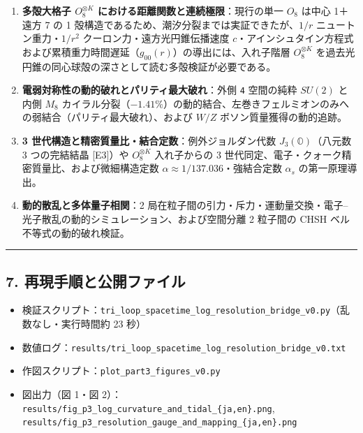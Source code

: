 \documentclass[
  a4paper,
]{ltjsarticle}
\providecommand{\tightlist}{%
  \setlength{\itemsep}{0pt}\setlength{\parskip}{0pt}}
\begin{document}
\begin{enumerate}
\def\labelenumi{\arabic{enumi}.}
\tightlist
\item
  \textbf{多殻大格子 \(O_8^{\otimes K}\)
  における距離関数と連続極限}：現行の単一 \(O_8\) は中心 1＋遠方 7 の 1
  殻構造であるため、潮汐分裂までは実証できたが、\(1/r\)
  ニュートン重力・\(1/r^2\) クーロン力・遠方光円錐伝播速度
  \(c\)・アインシュタイン方程式および累積重力時間遅延（\(g_{00}(r)\)）の導出には、入れ子階層
  \(O_8^{\otimes K}\)
  を過去光円錐の同心球殻の深さとして読む多殻検証が必要である。
\item
  \textbf{電弱対称性の動的破れとパリティ最大破れ}：外側 \texttt{4}
  空間の純粋 \(SU(2)\) と内側 \(M_8\)
  カイラル分裂（\(-1.41\%\)）の動的結合、左巻きフェルミオンのみへの弱結合（パリティ最大破れ）、および
  \(W/Z\) ボソン質量獲得の動的追跡。
\item
  \textbf{3 世代構造と精密質量比・結合定数}：例外ジョルダン代数
  \(J_3(\mathbb{O})\)（八元数 3 つの完結結晶 {[}E3{]}）や
  \(O_8^{\otimes K}\) 入れ子からの 3
  世代同定、電子・クォーク精密質量比、および微細構造定数
  \(\alpha \approx 1/137.036\)・強結合定数 \(\alpha_s\) の第一原理導出。
\item
  \textbf{動的散乱と多体量子相関}：2
  局在粒子間の引力・斥力・運動量交換・電子--光子散乱の動的シミュレーション、および空間分離
  2 粒子間の CHSH ベル不等式の動的破れ検証。
\end{enumerate}

\begin{center}\rule{0.5\linewidth}{0.5pt}\end{center}

\subsection{7.
再現手順と公開ファイル}\label{ux518dux73feux624bux9806ux3068ux516cux958bux30d5ux30a1ux30a4ux30eb}

\begin{itemize}
\tightlist
\item
  検証スクリプト：\texttt{tri\_loop\_spacetime\_log\_resolution\_bridge\_v0.py}（乱数なし・実行時間約
  23 秒）
\item
  数値ログ：\texttt{results/tri\_loop\_spacetime\_log\_resolution\_bridge\_v0.txt}
\item
  作図スクリプト：\texttt{plot\_part3\_figures\_v0.py}
\item
  図出力（図 1・図
  2）：\texttt{results/fig\_p3\_log\_curvature\_and\_tidal\_\{ja,en\}.png},
  \texttt{results/fig\_p3\_resolution\_gauge\_and\_mapping\_\{ja,en\}.png}
\end{itemize}
\end{document}
